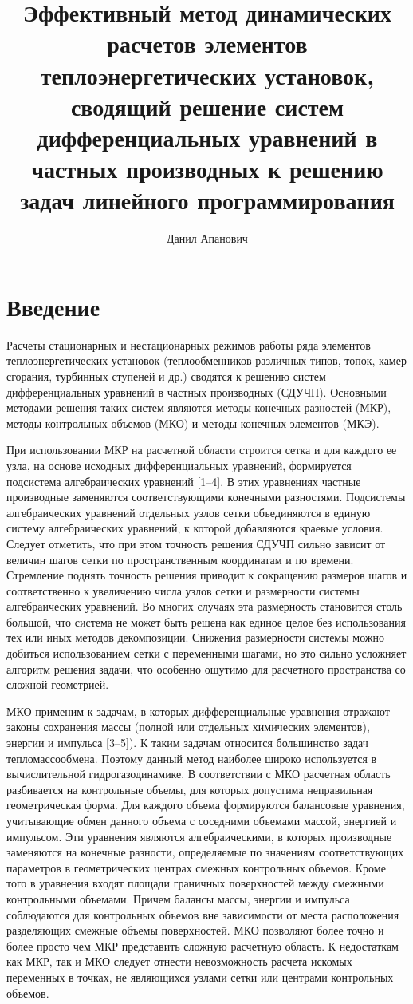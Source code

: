 \documentclass[a4paper,12pt]{article}
\title{Эффективный метод динамических расчетов элементов
теплоэнергетических установок, сводящий решение систем дифференциальных
уравнений в частных производных к решению задач линейного программирования}
\author{Данил Апанович}
\begin{document}
\maketitle

\section{Введение} 

Расчеты стационарных и нестационарных режимов работы ряда элементов
теплоэнергетических установок (теплообменников различных типов, топок,
камер сгорания, турбинных ступеней и др.) сводятся к решению систем
дифференциальных уравнений в частных производных (СДУЧП). Основными
методами решения таких систем являются методы конечных разностей (МКР),
методы контрольных объемов (МКО) и методы конечных элементов (МКЭ).  

При использовании МКР на расчетной области строится сетка и для каждого ее
узла, на основе исходных дифференциальных уравнений, формируется подсистема
алгебраических уравнений [1–4]. В этих уравнениях частные производные
заменяются соответствующими конечными разностями. Подсистемы алгебраических
уравнений отдельных узлов сетки объединяются в единую систему
алгебраических уравнений, к которой добавляются краевые условия. Следует
отметить, что при этом точность решения СДУЧП сильно зависит от величин
шагов сетки по пространственным координатам и по времени. Стремление
поднять точность решения приводит к сокращению размеров шагов и
соответственно к увеличению числа узлов сетки и размерности системы
алгебраических уравнений. Во многих случаях эта размерность становится
столь большой, что система не может быть решена как единое целое без
использования тех или иных методов декомпозиции.  Снижения размерности
системы можно добиться использованием сетки с переменными шагами, но это
сильно усложняет алгоритм решения задачи, что особенно ощутимо для
расчетного пространства со сложной геометрией.

МКО применим к задачам, в которых дифференциальные уравнения отражают
законы сохранения массы (полной или отдельных химических элементов),
энергии и импульса [3--5]). К таким задачам относится большинство задач
тепломассообмена.  Поэтому данный метод наиболее широко используется в
вычислительной гидрогазодинамике. В соответствии с МКО расчетная область
разбивается на контрольные объемы, для которых допустима неправильная
геометрическая форма.  Для каждого объема формируются балансовые уравнения,
учитывающие обмен данного объема с соседними объемами массой, энергией и
импульсом. Эти уравнения являются алгебраическими, в которых производные
заменяются на конечные разности, определяемые по значениям соответствующих
параметров в геометрических центрах смежных контрольных объемов. Кроме того
в уравнения входят площади граничных поверхностей между смежными
контрольными объемами. Причем балансы массы, энергии и импульса соблюдаются
для контрольных объемов вне зависимости от места расположения разделяющих
смежные объемы поверхностей. МКО позволяют более точно и более просто чем
МКР представить сложную расчетную область.  К недостаткам как МКР, так и
МКО следует отнести невозможность расчета искомых переменных в точках, не
являющихся узлами сетки или центрами контрольных объемов.
\end{document}
